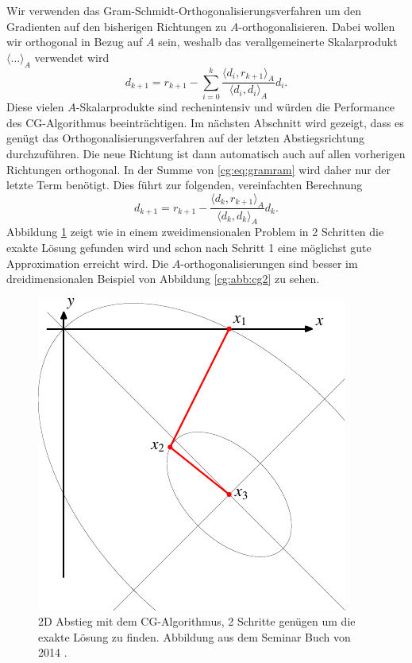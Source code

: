 Wir verwenden das Gram-Schmidt-Orthogonalisierungsverfahren um den Gradienten auf den bisherigen Richtungen zu $A$-orthogonalisieren.
Dabei wollen wir orthogonal in Bezug auf $A$ sein, weshalb das verallgemeinerte Skalarprodukt $\langle \dots \rangle_A$ verwendet wird 
\begin{equation}\label{cg:eq:gram}
	d_{k+1} 
	= 
	r_{k+1} - \sum_{i=0}^{k} \frac{\langle d_i , r_{k+1} \rangle_A}{\langle d_i , d_i \rangle_A} d_i.
\end{equation}
Diese vielen $A$-Skalarprodukte sind rechenintensiv und würden die Performance des CG-Algorithmus beeinträchtigen.
Im nächsten Abschnitt wird gezeigt, dass es genügt das Orthogonalisierungsverfahren auf der letzten Abstiegsrichtung durchzuführen.
Die neue Richtung ist dann automatisch auch auf allen vorherigen Richtungen orthogonal.
In der Summe von \ref{cg:eq:gramram} wird daher nur der letzte Term benötigt.
Dies führt zur folgenden, vereinfachten Berechnung
\begin{equation} 
	d_{k+1}
	= 
	r_{k+1} - \frac{\langle d_k , r_{k+1} \rangle_A}{\langle d_k , d_k \rangle_A} d_k.
\end{equation}
Abbildung \ref{cg:abb:cg1} zeigt wie in einem zweidimensionalen Problem in 2 Schritten die exakte Lösung gefunden wird und schon nach Schritt 1 eine möglichst gute Approximation erreicht wird.
Die $A$-orthogonalisierungen sind besser im dreidimensionalen Beispiel von Abbildung \ref{cg:abb:cg2} zu sehen.
\begin{figure}	
	\centering
	\includegraphics{papers/cg/images/descent-3}
	\caption{2D Abstieg mit dem CG-Algorithmus, 2 Schritte genügen um die exakte Lösung zu finden. 
		Abbildung aus dem Seminar Buch von 2014 \cite{cg:book:hpc}.}
	\label{cg:abb:cg1}
\end{figure}

